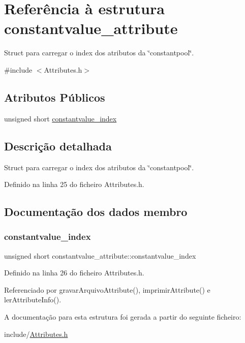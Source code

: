 \hypertarget{structconstantvalue__attribute}{}\section{Referência à estrutura constantvalue\+\_\+attribute}
\label{structconstantvalue__attribute}


Struct para carregar o index dos atributos da \char`\"{}constantpool\char`\"{}.  




{\ttfamily \#include $<$Attributes.\+h$>$}

\subsection*{Atributos Públicos}
\begin{DoxyCompactItemize}
\item 
unsigned short \hyperlink{structconstantvalue__attribute_ad58e1db4120139c8be419ec651ab3fc9}{constantvalue\+\_\+index}
\end{DoxyCompactItemize}


\subsection{Descrição detalhada}
Struct para carregar o index dos atributos da \char`\"{}constantpool\char`\"{}. 

Definido na linha 25 do ficheiro Attributes.\+h.



\subsection{Documentação dos dados membro}
\mbox{\label{structconstantvalue__attribute_ad58e1db4120139c8be419ec651ab3fc9}} 
\subsubsection{\texorpdfstring{constantvalue\+\_\+index}{constantvalue\_index}}
{\footnotesize\ttfamily unsigned short constantvalue\+\_\+attribute\+::constantvalue\+\_\+index}



Definido na linha 26 do ficheiro Attributes.\+h.



Referenciado por gravar\+Arquivo\+Attribute(), imprimir\+Attribute() e ler\+Attribute\+Info().



A documentação para esta estrutura foi gerada a partir do seguinte ficheiro\+:\begin{DoxyCompactItemize}
\item 
include/\hyperlink{Attributes_8h}{Attributes.\+h}\end{DoxyCompactItemize}
